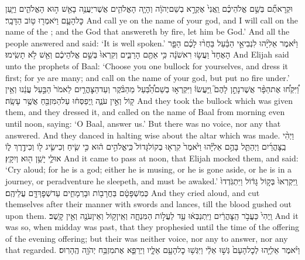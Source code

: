 {וּקְרָאתֶ֞ם בְּשֵׁ֣ם אֱלֹהֵיכֶ֗ם וַֽאֲנִי֙ אֶקְרָ֣א בְשֵׁם\maqqaf יְהֹוָ֔ה וְהָיָ֧ה הָאֱלֹהִ֛ים אֲשֶׁר\maqqaf יַעֲנֶ֥ה בָאֵ֖שׁ ה֣וּא הָאֱלֹהִ֑ים וַיַּ֧עַן כׇּל\maqqaf הָעָ֛ם וַיֹּאמְר֖וּ ט֥וֹב הַדָּבָֽר׃}
{And call ye on the name of your god, and I will call on the name of the \lord; and the God that answereth by fire, let him be God.’ And all the people answered and said: ‘It is well spoken.’}
{וַיֹּ֨אמֶר אֵלִיָּ֜הוּ לִנְבִיאֵ֣י הַבַּ֗עַל בַּחֲר֨וּ לָכֶ֜ם הַפָּ֤ר הָאֶחָד֙ וַעֲשׂ֣וּ רִאשֹׁנָ֔ה כִּ֥י אַתֶּ֖ם הָרַבִּ֑ים וְקִרְאוּ֙ בְּשֵׁ֣ם אֱלֹהֵיכֶ֔ם וְאֵ֖שׁ לֹ֥א תָשִֽׂימוּ׃}
{And Elijah said unto the prophets of Baal: ‘Choose you one bullock for yourselves, and dress it first; for ye are many; and call on the name of your god, but put no fire under.’}
{וַ֠יִּקְח֠וּ אֶת\maqqaf הַפָּ֨ר אֲשֶׁר\maqqaf נָתַ֣ן לָהֶם֮ וַֽיַּעֲשׂוּ֒ וַיִּקְרְא֣וּ בְשֵׁם\maqqaf הַ֠בַּ֠עַל מֵהַבֹּ֨קֶר וְעַד\maqqaf הַצׇּהֳרַ֤יִם לֵאמֹר֙ הַבַּ֣עַל עֲנֵ֔נוּ וְאֵ֥ין ק֖וֹל וְאֵ֣ין עֹנֶ֑ה וַֽיְפַסְּח֔וּ עַל\maqqaf הַמִּזְבֵּ֖חַ אֲשֶׁ֥ר עָשָֽׂה׃}
{And they took the bullock which was given them, and they dressed it, and called on the name of Baal from morning even until noon, saying: ‘O Baal, answer us.’ But there was no voice, nor any that answered. And they danced in halting wise about the altar which was made.}
{וַיְהִ֨י בַֽצׇּהֳרַ֜יִם וַיְהַתֵּ֧ל בָּהֶ֣ם אֵלִיָּ֗הוּ וַיֹּ֙אמֶר֙ קִרְא֤וּ בְקוֹל\maqqaf גָּדוֹל֙ כִּֽי\maqqaf אֱלֹהִ֣ים ה֔וּא כִּ֣י שִׂ֧יחַ וְכִי\maqqaf שִׂ֛יג ל֖וֹ וְכִי\maqqaf דֶ֣רֶךְ ל֑וֹ אוּלַ֛י יָשֵׁ֥ן ה֖וּא וְיִקָֽץ׃}
{And it came to pass at noon, that Elijah mocked them, and said: ‘Cry aloud; for he is a god; either he is musing, or he is gone aside, or he is in a journey, or peradventure he sleepeth, and must be awaked.’}
{וַֽיִּקְרְאוּ֙ בְּק֣וֹל גָּד֔וֹל וַיִּתְגֹּֽדְדוּ֙ כְּמִשְׁפָּטָ֔ם בַּחֲרָב֖וֹת וּבָרְמָחִ֑ים עַד\maqqaf שְׁפׇךְ\maqqaf דָּ֖ם עֲלֵיהֶֽם׃}
{And they cried aloud, and cut themselves after their manner with swords and lances, till the blood gushed out upon them.}
{וַֽיְהִי֙ כַּעֲבֹ֣ר הַֽצׇּהֳרַ֔יִם וַיִּֽתְנַבְּא֔וּ עַ֖ד לַעֲל֣וֹת הַמִּנְחָ֑ה וְאֵֽין\maqqaf ק֥וֹל וְאֵין\maqqaf עֹנֶ֖ה וְאֵ֥ין קָֽשֶׁב׃}
{And it was so, when midday was past, that they prophesied until the time of the offering of the evening offering; but their was neither voice, nor any to answer, nor any that regarded.}
{וַיֹּ֨אמֶר אֵלִיָּ֤הוּ לְכׇל\maqqaf הָעָם֙ גְּשׁ֣וּ אֵלַ֔י וַיִּגְּשׁ֥וּ כׇל\maqqaf הָעָ֖ם אֵלָ֑יו וַיְרַפֵּ֛א אֶת\maqqaf מִזְבַּ֥ח יְהֹוָ֖ה הֶֽהָרֽוּס׃}
